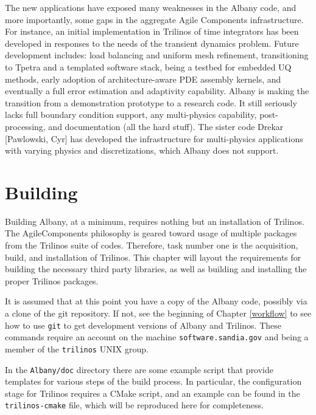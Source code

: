 \documentclass[pdf,12pt,report,strict]{SANDreport}
\theoremstyle{remark}
\begin{document}
The new applications have exposed many weaknesses in the Albany code,
and more importantly, some gaps in the aggregate Agile Components
infrastructure. For instance, an initial implementation in Trilinos of
time integrators has been developed in responses to the needs of the
transient dynamics problem. Future development includes: load
balancing and uniform mesh refinement, transitioning to Tpetra and a
templated software stack, being a testbed for embedded UQ methods,
early adoption of architecture-aware PDE assembly kernels, and
eventually a full error estimation and adaptivity capability. Albany
is making the transition from a demonstration prototype to a research
code. It still seriously lacks full boundary condition support, any
multi-physics capability, post-processing, and documentation (all the
hard stuff). The sister code Drekar [Pawlowski, Cyr] has developed the
infrastructure for multi-physics applications with varying physics and
discretizations, which Albany does not support.

\chapter{Building}
\label{build}

Building Albany, at a minimum, requires nothing but an installation of
Trilinos. The AgileComponents philosophy is geared toward usage of
multiple packages from the Trilinos suite of codes. Therefore, task
number one is the acquisition, build, and installation of
Trilinos. This chapter will layout the requirements for building the
necessary third party libraries, as well as building and installing
the proper Trilinos packages.  

It is assumed that at this point you
have a copy of the Albany code, possibly via a clone of the git
repository. If not, see the beginning of Chapter \ref{workflow} 
to see how to use \texttt{git} to get development versions of Albany and Trilinos.
These commands require an account on the machine \texttt{software.sandia.gov}
and being a member of the \texttt{trilinos} UNIX group.

In the {\tt Albany/doc} directory there are some example
script that provide templates for various steps of the build
process. In particular, the configuration stage for Trilinos requires
a CMake script, and an example can be found in the {\tt
  trilinos-cmake} file, which will be reproduced here for
completeness.
\end{document}

